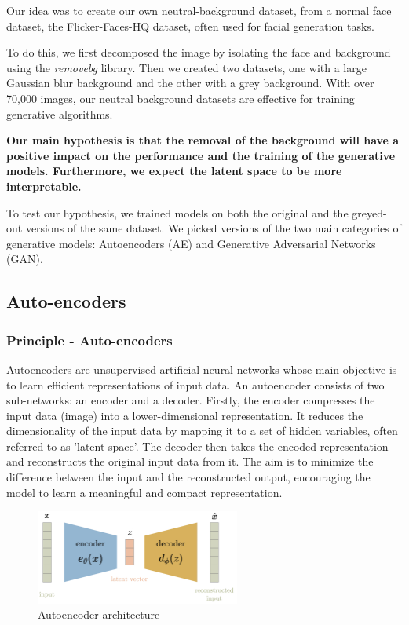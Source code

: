 \documentclass{article}
\begin{document}
\quad Our idea was to create our own neutral-background dataset, from a normal face dataset, the Flicker-Faces-HQ dataset, often used for facial generation tasks. 

To do this, we first decomposed the image by isolating the face and background using the \textit{removebg} library. 
Then we created two datasets, one with a large Gaussian blur background and the other with a grey background. 
With over 70,000 images, our neutral background datasets are effective for training generative algorithms.

\textbf{Our main hypothesis is that the removal of the background will have a positive impact on the performance and the training of the generative models. Furthermore, we expect the latent space to be more interpretable.}

To test our hypothesis, we trained models on both the original and the greyed-out versions of the same dataset. 
We picked versions of the two main categories of generative models: Autoencoders (AE) and Generative Adversarial Networks (GAN).

\subsection{Auto-encoders}
\subsubsection*{Principle - Auto-encoders}

\quad Autoencoders are unsupervised artificial neural networks whose main objective is to learn efficient representations of input data. 
An autoencoder consists of two sub-networks: an encoder and a decoder. 
Firstly, the encoder compresses the input data (image) into a lower-dimensional representation. 
It reduces the dimensionality of the input data by mapping it to a set of hidden variables, often referred to as 'latent space'. 
The decoder then takes the encoded representation and reconstructs the original input data from it. 
The aim is to minimize the difference between the input and the reconstructed output, encouraging the model to learn a meaningful and compact representation.

\begin{figure}[H]
    \centering
    \includegraphics[width=0.6\textwidth]{images/ae.png}
    \caption{Autoencoder architecture}
\end{figure}
\end{document}
